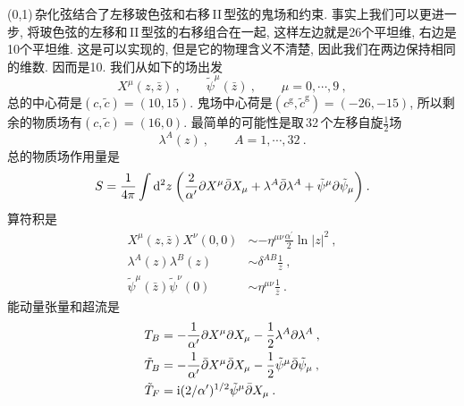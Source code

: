 (0,1)\,杂化弦结合了左移玻色弦和右移\,II\,型弦的鬼场和约束. 事实上我们可以更进一步, 将玻色弦的左移和\,II\,型弦的右移组合在一起, 这样左边就是26个平坦维, 右边是10个平坦维. 这是可以实现的, 但是它的物理含义不清楚, 因此我们在两边保持相同的维数. 因而是10. 我们从如下的场出发
\begin{equation}
    X^{\mu}(z,\bar{z})\:,\qquad \tilde{\psi}^{\mu}(\bar{z}) \:, \qquad \mu = 0,\cdots,9\:, \label{11.2.1}
\end{equation}
总的中心荷是$ (c,\tilde{c})=(10,15)$. 鬼场中心荷是$(c^{\text{g}},\tilde{c}^{\text{g}})=(-26,-15)$, 所以剩余的物质场有$(c,\tilde{c})=(16,0)$. 最简单的可能性是取\,32\,个左移自旋$ \frac{1}{2} $场
\begin{equation}
    \lambda^{A}(z) \:, \qquad A=1,\cdots,32\:. \label{11.2.2}
\end{equation}
总的物质场作用量是
\begin{equation}
    S=\frac{1}{4\pi} \int \mathrm{d}^{2}z\: \biggl( \frac{2}{\alpha^{\prime}}\partial X^{\mu}\bar{\partial}X_{\mu}
    +\lambda^{A}\bar{\partial}\lambda^{A}+\tilde{\psi}^{\mu}\partial\tilde{\psi}_{\mu}\biggr)\:.\label{11.2.3}
\end{equation}
算符积是
\begin{subequations}
    \begin{align}
        X^{\mu}(z,\bar{z})X^{\nu}(0,0) &\sim -\eta^{\mu\nu} \frac{\alpha^{\prime}}{2} \ln\lvert z\rvert^{2} \:,\label{11.2.4a} \\
        \lambda^{A}(z)\lambda^{B}(z) &\sim \delta^{AB}\frac{1}{z} \:, \label{11.2.4b} \\
        \tilde{\psi}^{\mu}(\bar{z})\tilde{\psi}^{\nu}(0) &\sim \eta^{\mu\nu}\frac{1}{\bar{z}} \:.\label{11.2.4c}
    \end{align}
\end{subequations}
能动量张量和超流是
\begin{subequations}
    \begin{align}
        T_{B} &= -\frac{1}{\alpha^{\prime}}\partial X^{\mu}\partial X_{\mu} -\frac{1}{2}\lambda^{A}\partial\lambda^{A}\:,\label{11.2.5a} \\
        \tilde{T}_{B}&= -\frac{1}{\alpha^{\prime}}\bar{\partial}X^{\mu}\bar{\partial}X_{\mu} 
        -\frac{1}{2}\tilde{\psi}^{\mu}\bar{\partial}\tilde{\psi}_{\mu} \:, \label{11.2.5b} \\
        \tilde{T}_{F}&= \mathrm{i}(2/\alpha^{\prime})^{1/2}\tilde{\psi}^{\mu}\bar{\partial}X_{\mu} \:.\label{11.2.5c}
    \end{align} \label{11.2.5}
\end{subequations}

